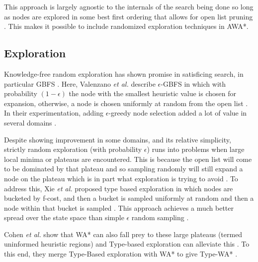 This approach is largely agnostic to the internals of the search being done so long as nodes are explored in some best first ordering that allows for open list pruning \cite{hansen2007anytime}. This makes it possible to include randomized exploration techniques in AWA*.

\subsection{Exploration}
Knowledge-free random exploration has shown promise in satisficing search, in particular GBFS \cite{valenzano2014comparison}. Here, Valenzano \textit{et al.} describe $\epsilon$-GBFS in which with probability $(1-\epsilon)$ the node with the smallest heuristic value is chosen for expansion, otherwise, a node is chosen uniformly at random from the open list \cite{valenzano2014comparison}. In their experimentation, adding $\epsilon$-greedy node selection added a lot of value in several domains \cite{valenzano2014comparison}.

Despite showing improvement in some domains, and its relative simplicity, strictly random exploration (with probability $\epsilon$) runs into problems when large local minima or plateaus are encountered. This is because the open list will come to be dominated by that plateau and so sampling randomly will still expand a node on the plateau which is in part what exploration is trying to avoid \cite{xie2014type}\cite{cohen2021type}. To address this, Xie \textit{et al.} proposed type based exploration in which nodes are bucketed by f-cost, and then a bucket is sampled uniformly at random and then a node within that bucket is sampled \cite{xie2014type}. This approach achieves a much better spread over the state space than simple $\epsilon$ random sampling \cite{xie2014type}.

Cohen \textit{et al.} show that WA* can also fall prey to these large plateaus (termed uninformed heuristic regions) and Type-based exploration can alleviate this \cite{cohen2021type}. To this end, they merge Type-Based exploration with WA* to give Type-WA* \cite{cohen2021type}. 

